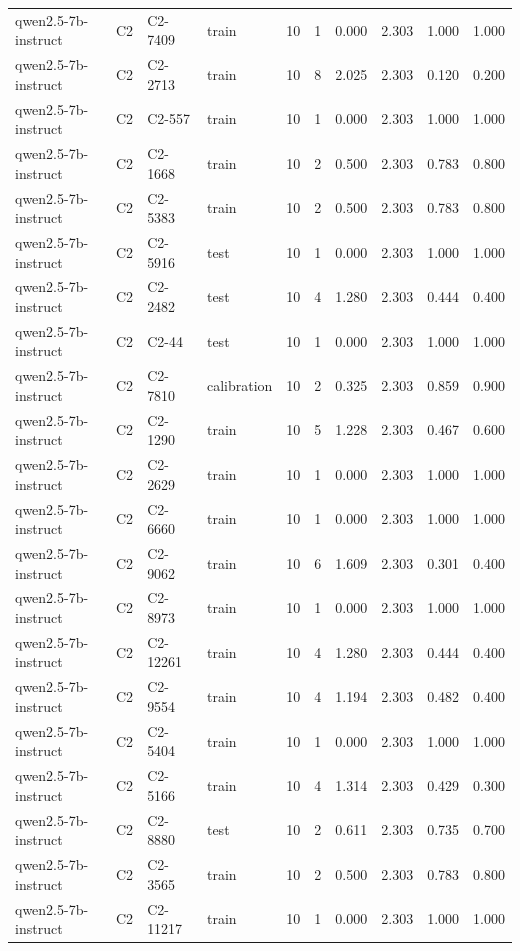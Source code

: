 \begin{table}
\begin{tabular}{llllrrrrrr}
qwen2.5-7b-instruct & C2 & C2-7409 & train & 10 & 1 & 0.000 & 2.303 & 1.000 & 1.000 \\
qwen2.5-7b-instruct & C2 & C2-2713 & train & 10 & 8 & 2.025 & 2.303 & 0.120 & 0.200 \\
qwen2.5-7b-instruct & C2 & C2-557 & train & 10 & 1 & 0.000 & 2.303 & 1.000 & 1.000 \\
qwen2.5-7b-instruct & C2 & C2-1668 & train & 10 & 2 & 0.500 & 2.303 & 0.783 & 0.800 \\
qwen2.5-7b-instruct & C2 & C2-5383 & train & 10 & 2 & 0.500 & 2.303 & 0.783 & 0.800 \\
qwen2.5-7b-instruct & C2 & C2-5916 & test & 10 & 1 & 0.000 & 2.303 & 1.000 & 1.000 \\
qwen2.5-7b-instruct & C2 & C2-2482 & test & 10 & 4 & 1.280 & 2.303 & 0.444 & 0.400 \\
qwen2.5-7b-instruct & C2 & C2-44 & test & 10 & 1 & 0.000 & 2.303 & 1.000 & 1.000 \\
qwen2.5-7b-instruct & C2 & C2-7810 & calibration & 10 & 2 & 0.325 & 2.303 & 0.859 & 0.900 \\
qwen2.5-7b-instruct & C2 & C2-1290 & train & 10 & 5 & 1.228 & 2.303 & 0.467 & 0.600 \\
qwen2.5-7b-instruct & C2 & C2-2629 & train & 10 & 1 & 0.000 & 2.303 & 1.000 & 1.000 \\
qwen2.5-7b-instruct & C2 & C2-6660 & train & 10 & 1 & 0.000 & 2.303 & 1.000 & 1.000 \\
qwen2.5-7b-instruct & C2 & C2-9062 & train & 10 & 6 & 1.609 & 2.303 & 0.301 & 0.400 \\
qwen2.5-7b-instruct & C2 & C2-8973 & train & 10 & 1 & 0.000 & 2.303 & 1.000 & 1.000 \\
qwen2.5-7b-instruct & C2 & C2-12261 & train & 10 & 4 & 1.280 & 2.303 & 0.444 & 0.400 \\
qwen2.5-7b-instruct & C2 & C2-9554 & train & 10 & 4 & 1.194 & 2.303 & 0.482 & 0.400 \\
qwen2.5-7b-instruct & C2 & C2-5404 & train & 10 & 1 & 0.000 & 2.303 & 1.000 & 1.000 \\
qwen2.5-7b-instruct & C2 & C2-5166 & train & 10 & 4 & 1.314 & 2.303 & 0.429 & 0.300 \\
qwen2.5-7b-instruct & C2 & C2-8880 & test & 10 & 2 & 0.611 & 2.303 & 0.735 & 0.700 \\
qwen2.5-7b-instruct & C2 & C2-3565 & train & 10 & 2 & 0.500 & 2.303 & 0.783 & 0.800 \\
qwen2.5-7b-instruct & C2 & C2-11217 & train & 10 & 1 & 0.000 & 2.303 & 1.000 & 1.000 \\

\end{tabular}
\end{table}
